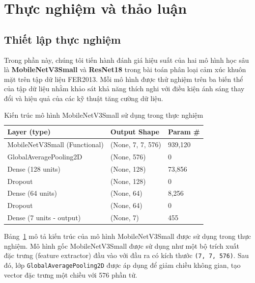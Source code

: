 \section{Thực nghiệm và thảo luận} %

\subsection{Thiết lập thực nghiệm} %

Trong phần này, chúng tôi tiến hành đánh giá hiệu suất của hai mô hình học sâu là \textbf{MobileNetV3Small} và \textbf{ResNet18} trong bài toán phân loại cảm xúc khuôn mặt trên tập dữ liệu FER2013. Mỗi mô hình được thử nghiệm trên ba biến thể của tập dữ liệu nhằm khảo sát khả năng thích nghi với điều kiện ánh sáng thay đổi và hiệu quả của các kỹ thuật tăng cường dữ liệu.

\begin{table}[H]
\centering
\caption{Kiến trúc mô hình MobileNetV3Small sử dụng trong thực nghiệm}
\begin{tabular}{@{}lll@{}}
\toprule
\textbf{Layer (type)} & \textbf{Output Shape} & \textbf{Param \#} \\ \midrule
MobileNetV3Small (Functional)   & (None, 7, 7, 576) & 939,120 \\
GlobalAveragePooling2D          & (None, 576)       & 0       \\
Dense (128 units)               & (None, 128)       & 73,856  \\
Dropout                         & (None, 128)       & 0       \\
Dense (64 units)                & (None, 64)        & 8,256   \\
Dropout                         & (None, 64)        & 0       \\
Dense (7 units - output)        & (None, 7)         & 455     \\ \bottomrule
\end{tabular}
\label{tab:model-architecture}
\end{table}

Bảng~\ref{tab:model-architecture} mô tả kiến trúc của mô hình MobileNetV3Small được sử dụng trong thực nghiệm. Mô hình gốc MobileNetV3Small được sử dụng như một bộ trích xuất đặc trưng (feature extractor) đầu vào với đầu ra có kích thước \texttt{(7, 7, 576)}. Sau đó, lớp \texttt{GlobalAveragePooling2D} được áp dụng để giảm chiều không gian, tạo vector đặc trưng một chiều với 576 phần tử.


